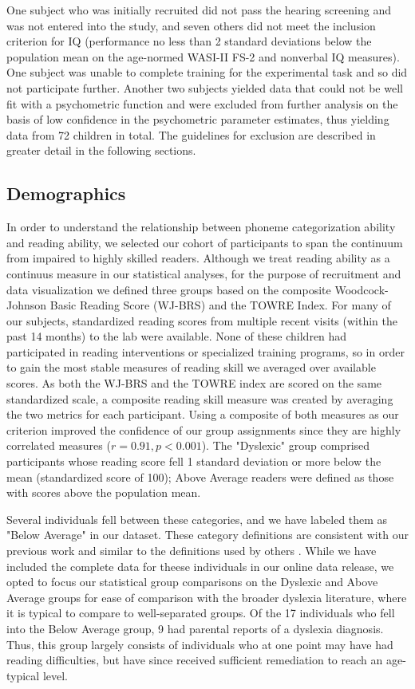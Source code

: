 \documentclass[../uwthesis.tex]{subfiles}
\begin{document}
One subject who was initially recruited did not pass the hearing screening and was not entered into the study, and seven others did not meet the inclusion criterion for IQ (performance no less than 2 standard deviations below the population mean on the age-normed WASI-II FS-2 and nonverbal IQ measures). One subject was unable to complete training for the experimental task and so did not participate further. Another two subjects yielded data that could not be well fit with a psychometric function and were excluded from further analysis on the basis of low confidence in the psychometric parameter estimates, thus yielding data from 72 children in total. The guidelines for exclusion are described in greater detail in the following sections.

\subsection{Demographics}
In order to understand the relationship between phoneme categorization ability and reading ability, we selected our cohort of participants to span the continuum from impaired to highly skilled readers. Although we treat reading ability as a continuus measure in our statistical analyses, for the purpose of recruitment and data visualization we defined three groups based on the composite Woodcock-Johnson Basic Reading Score (WJ-BRS) and the TOWRE Index. For many of our subjects, standardized reading scores from multiple recent visits (within the past 14 months) to the lab were available. None of these children had participated in reading interventions or specialized training programs, so in order to gain the most stable measures of reading skill we averaged over available scores. As both the WJ-BRS and the TOWRE index are scored on the same standardized scale, a composite reading skill measure was created by averaging the two metrics for each participant. Using a composite of both measures as our criterion improved the confidence of our group assignments since they are highly correlated measures ($r=0.91, p<0.001$). The "Dyslexic" group comprised participants whose reading score fell 1 standard deviation or more below the mean (standardized score of 100); Above Average readers were defined as those with scores above the population mean.

Several individuals fell between these categories, and we have labeled them as "Below Average" in our dataset. These category definitions are consistent with our previous work \cite{OBrien2018} and similar to the definitions used by others \cite{Rimrodt2010WhiteDyslexia,Shaywitz2002DisruptionDyslexia}. While we have included the complete data for theese individuals in our online data release, we opted to focus our statistical group comparisons on the Dyslexic and Above Average groups for ease of comparison with the broader dyslexia literature, where it is typical to compare to well-separated groups. Of the 17 individuals who fell into the Below Average group, 9 had parental reports of a dyslexia diagnosis. Thus, this group largely consists of individuals who at one point may have had reading difficulties, but have since received sufficient remediation to reach an age-typical level.
\end{document}
